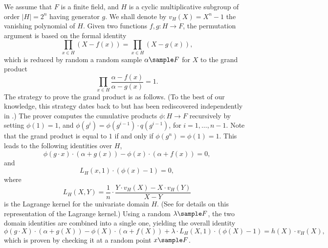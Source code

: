 \documentclass[11pt]{article}
\theoremstyle{definition}
\theoremstyle{remark}
\begin{document}
We assume that $F$ is a finite field, and $H$ is a cyclic multiplicative subgroup of order $|H|=2^n$ having generator $g$.
We shall denote by $v_H(X) = X^n - 1$ the vanishing polynomial of $H$.
Given two functions $f, g: H\rightarrow F$, the permutation argument is based on the formal identity 
\[
\prod_{x\in H} (X - f(x)) = \prod_{x\in H} (X - g(x)),
\]
which is reduced by random a random sample $\alpha\sample F$ for $X$ to the grand product
\[
\prod_{x\in H} \frac{\alpha - f(x)}{\alpha - g(x)} = 1.
\]
The strategy to prove the grand product is as follows. 
(To the best of our knowledge, this strategy dates back to \cite{tinyRAM} but has been rediscovered independently in \cite{Plonk}.)
The prover computes the cumulative products $\phi: H\rightarrow F$ recursively  by setting $\phi(1)= 1$, and $\phi(g^i )= \phi(g^{i-1})\cdot q(g^{i-1})$, for $i=1,\ldots, n-1$.
Note that the grand product is equal to $1$ if and only if $\phi(g^n) = \phi(1) = 1$.
This leads to the following identities over $H$,
\begin{equation}
\phi(g\cdot x) \cdot (\alpha + g(x)) - \phi(x)\cdot (\alpha + f(x))
= 0,
\end{equation}
and
\begin{equation}
L_H(x, 1)\cdot (\phi(x) - 1) = 0,
\end{equation}
where 
\begin{equation}
\label{e:uv:lagrange}
L_H(X, Y) = \frac{1}{n}\cdot \frac{Y\cdot v_H(X) - X\cdot v_H(Y)}{X - Y}
\end{equation}
is the Lagrange kernel for the univariate domain $H$.
(See \cite{Darlin} for details on this representation of the Lagrange kernel.)
Using a random $\lambda\sample F$, the two domain identities are combined into a single one, yielding the overall identity
\begin{equation}
\label{e:uv:pa:overall:identity}
\phi(g\cdot X) \cdot (\alpha + g(X)) - \phi(X)\cdot (\alpha + f(X)) + \lambda\cdot L_H(X, 1)\cdot (\phi(X) - 1) = h(X)\cdot v_H(X),
\end{equation}
which is proven by checking it at a random point $x\sample F$. 
\end{document}
